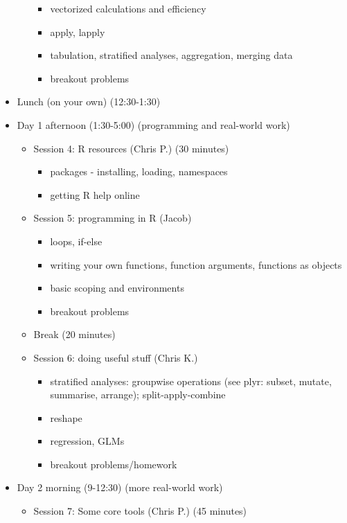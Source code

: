 \documentclass[12pt]{article}\usepackage{graphicx, color}
\begin{document}
\begin{itemize}
\begin{itemize}
\begin{itemize}
\item vectorized calculations and efficiency
\item apply, lapply
\item tabulation, stratified analyses, aggregation, merging data
\item breakout problems 
\end{itemize}
\end{itemize}
\item Lunch (on your own) (12:30-1:30)
\item Day 1 afternoon (1:30-5:00) (programming and real-world work)

\begin{itemize}
\item Session 4: R resources (Chris P.) (30 minutes)

\begin{itemize}
\item packages - installing, loading, namespaces
\item getting R help online 
\end{itemize}
\item Session 5: programming in R (Jacob)

\begin{itemize}
\item loops, if-else
\item writing your own functions, function arguments, functions as objects
\item basic scoping and environments
\item breakout problems
\end{itemize}
\item Break (20 minutes)
\item Session 6: doing useful stuff (Chris K.)

\begin{itemize}
\item stratified analyses: groupwise operations (see plyr: subset, mutate,
summarise, arrange); split-apply-combine
\item reshape
\item regression, GLMs 
\item breakout problems/homework 
\end{itemize}
\end{itemize}
\item Day 2 morning (9-12:30) (more real-world work)

\begin{itemize}
\item Session 7: Some core tools (Chris P.) (45 minutes)


\end{itemize}
\end{itemize}
\end{document}
